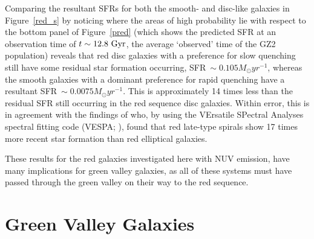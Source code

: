 Comparing the resultant SFRs for both the smooth- and disc-like galaxies in Figure~\ref{red_s} by noticing where the areas of high probability lie with respect to the bottom panel of Figure~\ref{pred} (which shows the predicted SFR at an observation time of $t\sim12.8~\rm{Gyr}$, the average `observed' time of the GZ2 population) reveals that red disc galaxies with a preference for slow quenching still have some residual star formation occurring, SFR$~\sim0.105 M_{\odot}yr^{-1}$, whereas the smooth galaxies with a dominant preference for rapid quenching have a resultant SFR$~\sim0.0075 M_{\odot}yr^{-1}$. This is approximately 14 times less than the residual SFR still occurring in the red sequence disc galaxies. Within error, this is in agreement with the findings of \citet{tojeiro13} who, by using the VErsatile SPectral Analyses spectral fitting code (VESPA; \citealt{tojeiro07}), found that red late-type spirals show 17 times more recent star formation than red elliptical galaxies.

These results for the red galaxies investigated here with NUV emission, have many implications for green valley galaxies, as all of these systems must have passed through the green valley on their way to the red sequence. 

\section{Green Valley Galaxies}\label{gv}

